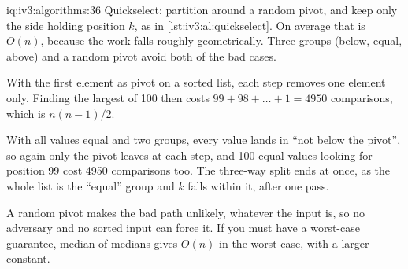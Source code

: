 \begin{solution}{iq:iv3:algorithms:36}
Quickselect: partition around a random pivot, and keep only the side holding position $k$, as in \cref{lst:iv3:al:quickselect}. On average that is $O(n)$, because the work falls roughly geometrically. Three groups (below, equal, above) and a random pivot avoid both of the bad cases.
\label{lst:iv3:al:quickselect}

With the first element as pivot on a sorted list, each step removes one element only. Finding the largest of 100 then costs $99 + 98 + \dots + 1 = 4950$ comparisons, which is $n(n-1)/2$.

With all values equal and two groups, every value lands in ``not below the pivot'', so again only the pivot leaves at each step, and 100 equal values looking for position 99 cost 4950 comparisons too. The three-way split ends at once, as the whole list is the ``equal'' group and $k$ falls within it, after one pass.

A random pivot makes the bad path unlikely, whatever the input is, so no adversary and no sorted input can force it. If you must have a worst-case guarantee, median of medians gives $O(n)$ in the worst case, with a larger constant.

\end{solution}

